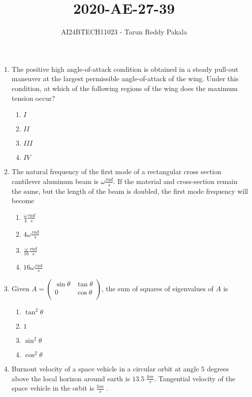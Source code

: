 \documentclass[journal,12pt,onecolumn]{IEEEtran}
\title{2020-AE-27-39}
\author{AI24BTECH11023 - Tarun Reddy Pakala}
\theoremstyle{remark}
\begin{document}


\maketitle
\bigskip
\renewcommand{\thefigure}{\theenumi}
\renewcommand{\thetable}{\theenumi}
\begin{enumerate}
\item The positive high angle-of-attack condition is obtained in a steady pull-out maneuver at the largest permissible angle-of-attack of the wing. Under this condition, at which of the following regions of the wing does the maximum tension occur?

\begin{enumerate}
    \item $I$
    \item $II$
    \item $III$
    \item $IV$
\end{enumerate}
\item The natural frequency of the first mode of a rectangular cross section cantilever aluminum beam is $\omega \frac{rad}{s}$. If the material and cross-section remain the same, but the length of the beam is doubled, the first mode frequency will become
\begin{enumerate}
    \item $\frac{\omega}{4}\frac{rad}{s}$
    \item $4\omega \frac{rad}{s}$
    \item $\frac{\omega}{16} \frac{rad}{s}$
    \item $16\omega \frac{rad}{s}$
\end{enumerate}
\item Given $A=\begin{pmatrix}
    \sin \theta & \tan \theta \\
    0 & \cos \theta \\
\end{pmatrix}$, the sum of squares of eigenvalues of $A$ is
\begin{enumerate}
    \item $\tan^2\theta$
    \item $1$
    \item $\sin^2\theta$
    \item $\cos^2\theta$
\end{enumerate}
\item Burnout velocity of a space vehicle in a circular orbit at angle $5$ degrees above the local horizon around earth is $13.5\;\frac{km}{s}$. Tangential velocity of the space vehicle in the orbit is \underline{\hspace{2cm}} $\frac{km}{s}$ .

\end{enumerate}
\end{document}
